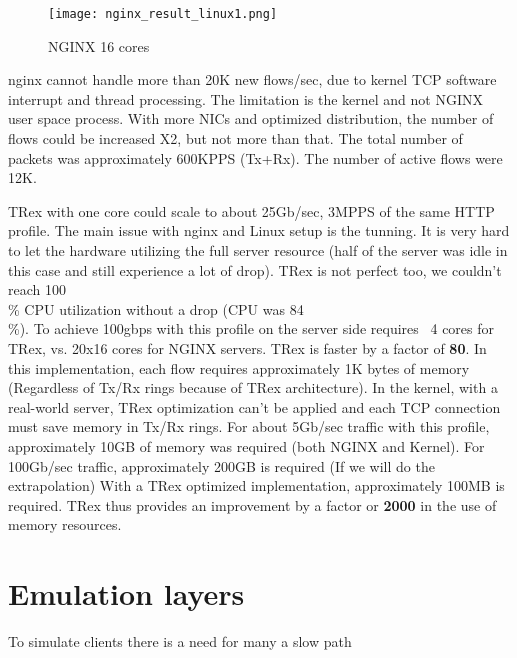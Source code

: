 \documentclass[conference]{IEEEtran}
\begin{document}
\begin{figure}[h]
  \texttt{[image: nginx\_result\_linux1.png]}
  \caption{NGINX 16 cores}
  \label{fig:trex_nginx_r2}
\end{figure}

nginx cannot handle more than 20K new flows/sec, due to kernel TCP software interrupt and thread processing. 
The limitation is the kernel and not NGINX user space process.
 With more NICs and optimized distribution, the number of flows could be increased X2, but not more than that. 
 The total number of packets was approximately 600KPPS (Tx+Rx). The number of active flows were 12K.

TRex with one core could scale to about 25Gb/sec, 3MPPS of the same HTTP profile.
The main issue with nginx and Linux setup is the tunning. 
It is very hard to let the hardware utilizing the full server resource (half of the server was idle in this case and still experience a lot of drop). 
TRex is not perfect too, we couldn't reach 100\\\% CPU utilization without a drop (CPU was 84\\\%). To achieve 100gbps with this profile on the server side requires ~4 cores for TRex, vs. 20x16 cores for NGINX servers. 
TRex is faster by a factor of \textbf{80}. In this implementation, each flow requires approximately 1K bytes of memory (Regardless of Tx/Rx rings because of TRex architecture). 
In the kernel, with a real-world server, TRex optimization can't be applied and each TCP connection must save memory in Tx/Rx rings.
For about 5Gb/sec traffic with this profile, approximately 10GB of memory was required (both NGINX and Kernel). For 100Gb/sec traffic, approximately 200GB is required (If we will do the extrapolation)  With a TRex optimized implementation, approximately 100MB is required. 
TRex thus provides an improvement by a factor or \textbf{2000} in the use of memory resources.

\section{Emulation layers}

To simulate clients there is a need for many a slow path 
\end{document}
